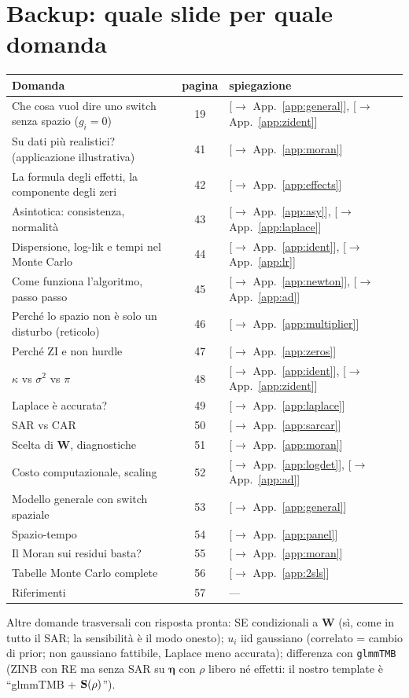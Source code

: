 \documentclass[11pt,a4paper]{article}
\newcommand{\app}[1]{{\small\color{navy}[$\to$ App.~\ref{#1}]}}
\newcommand{\bW}{\mathbf{W}}\newcommand{\bX}{\mathbf{X}}\newcommand{\bZ}{\mathbf{Z}}\newcommand{\by}{\mathbf{y}}
\newcommand{\beeta}{\boldsymbol{\eta}}\newcommand{\bbeta}{\boldsymbol{\beta}}\newcommand{\bgamma}{\boldsymbol{\gamma}}
\begin{document}
\section{Backup: quale slide per quale domanda}
\begin{center}\small
\begin{tabular}{p{5.2cm}cp{6.8cm}}\toprule
Domanda & pagina & spiegazione\\\midrule
Che cosa vuol dire uno switch senza spazio ($g_i=0$) & 19 & \app{app:general}, \app{app:zident}\\
Su dati più realistici? (applicazione illustrativa) & 41 & \app{app:moran}\\
La formula degli effetti, la componente degli zeri & 42 & \app{app:effects}\\
Asintotica: consistenza, normalità & 43 & \app{app:asy}, \app{app:laplace}\\
Dispersione, log-lik e tempi nel Monte Carlo & 44 & \app{app:ident}, \app{app:lr}\\
Come funziona l'algoritmo, passo passo & 45 & \app{app:newton}, \app{app:ad}\\
Perché lo spazio non è solo un disturbo (reticolo) & 46 & \app{app:multiplier}\\
Perché ZI e non hurdle & 47 & \app{app:zeros}\\
$\kappa$ vs $\sigma^2$ vs $\pi$ & 48 & \app{app:ident}, \app{app:zident}\\
Laplace è accurata? & 49 & \app{app:laplace}\\
SAR vs CAR & 50 & \app{app:sarcar}\\
Scelta di $\bW$, diagnostiche & 51 & \app{app:moran}\\
Costo computazionale, scaling & 52 & \app{app:logdet}, \app{app:ad}\\
Modello generale con switch spaziale & 53 & \app{app:general}\\
Spazio-tempo & 54 & \app{app:panel}\\
Il Moran sui residui basta? & 55 & \app{app:moran}\\
Tabelle Monte Carlo complete & 56 & \app{app:2sls}\\
Riferimenti & 57 & ---\\\bottomrule
\end{tabular}
\end{center}
Altre domande trasversali con risposta pronta: SE condizionali a $\bW$ (sì, come in tutto il SAR; la sensibilità è il modo onesto); $u_i$ iid gaussiano (correlato = cambio di prior; non gaussiano fattibile, Laplace meno accurata); differenza con \texttt{glmmTMB} (ZINB con RE ma senza SAR su $\beeta$ con $\rho$ libero né effetti: il nostro template è ``glmmTMB + $\mathbf{S}(\rho)$'').
\end{document}
